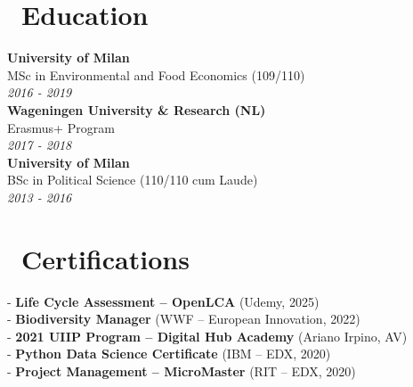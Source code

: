 \documentclass[a4paper,12pt]{article}
\begin{document}
\begin{paracol}{2}
\section{\faGraduationCap\ Education}

\textbf{University of Milan}\\
MSc in Environmental and Food Economics (109/110)\\
\textit{2016 - 2019}\\[0.2cm]

\textbf{Wageningen University \& Research (NL)}\\
Erasmus+ Program\\
\textit{2017 - 2018}\\[0.2cm]

\textbf{University of Milan}\\
BSc in Political Science (110/110 cum Laude)\\
\textit{2013 - 2016}

\section{\faCertificate\ Certifications}
\noindent - \textbf{Life Cycle Assessment – OpenLCA} (Udemy, 2025)\\
- \textbf{Biodiversity Manager} (WWF – European Innovation, 2022)\\
- \textbf{2021 UIIP Program – Digital Hub Academy} (Ariano Irpino, AV)\\
- \textbf{Python Data Science Certificate} (IBM – EDX, 2020)\\
- \textbf{Project Management – MicroMaster} (RIT – EDX, 2020)

\end{paracol}
\end{document}

